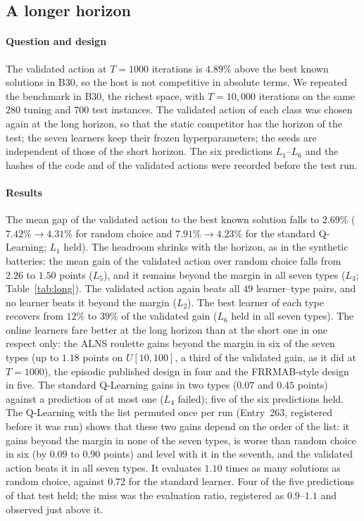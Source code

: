 \subsection{A longer horizon}
\label{sec:longT}
\paragraph{Question and design} The validated action at $T=1000$ iterations is $4.89\%$ above the best known solutions in B30, so the host is not competitive in absolute terms. We repeated the benchmark in B30, the richest space, with $T=10{,}000$ iterations on the same $280$ tuning and $700$ test instances. The validated action of each class was chosen again at the long horizon, so that the static competitor has the horizon of the test; the seven learners keep their frozen hyperparameters; the seeds are independent of those of the short horizon. The six predictions $L_1$--$L_6$ and the hashes of the code and of the validated actions were recorded before the test run.

\paragraph{Results} The mean gap of the validated action to the best known solution falls to $2.69\%$ ($7.42\%\to4.31\%$ for random choice and $7.91\%\to4.23\%$ for the standard Q-Learning; $L_1$ held). The headroom shrinks with the horizon, as in the synthetic batteries: the mean gain of the validated action over random choice falls from $2.26$ to $1.50$ points ($L_5$), and it remains beyond the margin in all seven types ($L_3$; Table~\ref{tab:long}). The validated action again beats all $49$ learner--type pairs, and no learner beats it beyond the margin ($L_2$). The best learner of each type recovers from $12\%$ to $39\%$ of the validated gain ($L_6$ held in all seven types). The online learners fare better at the long horizon than at the short one in one respect only: the ALNS roulette gains beyond the margin in six of the seven types (up to $1.18$ points on $U[10,100]$, a third of the validated gain, as it did at $T=1000$), the episodic published design in four and the FRRMAB-style design in five. The standard Q-Learning gains in two types ($0.07$ and $0.45$ points) against a prediction of at most one ($L_4$ failed); five of the six predictions held. The Q-Learning with the list permuted once per run (Entry~263, registered before it was run) shows that these two gains depend on the order of the list: it gains beyond the margin in none of the seven types, is worse than random choice in six (by $0.09$ to $0.90$ points) and level with it in the seventh, and the validated action beats it in all seven types. It evaluates $1.10$ times as many solutions as random choice, against $0.72$ for the standard learner. Four of the five predictions of that test held; the miss was the evaluation ratio, registered as $0.9$--$1.1$ and observed just above it.

